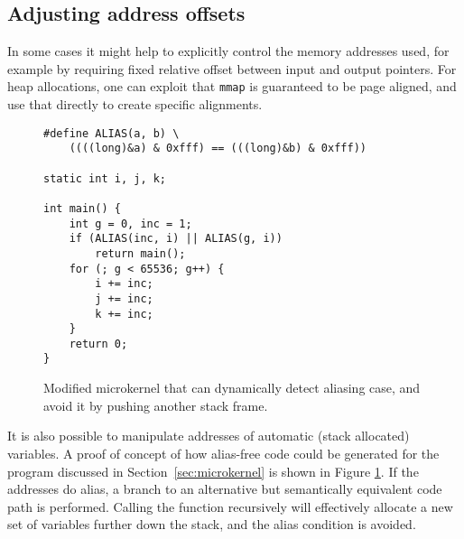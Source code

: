 \documentclass[10pt, conference, compsocconf]{IEEEtran}
\begin{document}
\subsection{Adjusting address offsets}
In some cases it might help to explicitly control the memory addresses used, for example by requiring fixed relative offset between input and output pointers.
For heap allocations, one can exploit that \texttt{mmap} is guaranteed to be page aligned, and use that directly to create specific alignments.

\begin{figure}
  \begin{lstlisting}[frame=single, xleftmargin=.005\textwidth, xrightmargin=.005\textwidth]
#define ALIAS(a, b) \
    ((((long)&a) & 0xfff) == (((long)&b) & 0xfff))

static int i, j, k;

int main() {
    int g = 0, inc = 1;
    if (ALIAS(inc, i) || ALIAS(g, i))
        return main();
    for (; g < 65536; g++) {
        i += inc;
        j += inc;
        k += inc;
    }
    return 0;
}
  \end{lstlisting}
  \caption{Modified microkernel that can dynamically detect aliasing case, and avoid it by pushing another stack frame.}
  \label{lst:loopfixed}
\end{figure}

It is also possible to manipulate addresses of automatic (stack allocated) variables.
A proof of concept of how alias-free code could be generated for the program discussed in Section~\ref{sec:microkernel} is shown in Figure \ref{lst:loopfixed}.
If the addresses do alias, a branch to an alternative but semantically equivalent code path is performed.
Calling the function recursively will effectively allocate a new set of variables further down the stack, and the alias condition is avoided.
\end{document}
